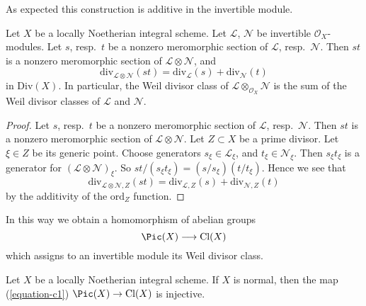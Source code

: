 \noindent
As expected this construction is additive in the invertible module.

\begin{lemma}
\label{lemma-c1-additive}
Let $X$ be a locally Noetherian integral scheme.
Let $\mathcal{L}$, $\mathcal{N}$ be invertible $\mathcal{O}_X$-modules.
Let $s$, resp.\ $t$ be a nonzero meromorphic section
of $\mathcal{L}$, resp.\ $\mathcal{N}$. Then $st$ is a nonzero
meromorphic section of $\mathcal{L} \otimes \mathcal{N}$, and
$$
\text{div}_{\mathcal{L} \otimes \mathcal{N}}(st)
=
\text{div}_\mathcal{L}(s) + \text{div}_\mathcal{N}(t)
$$
in $\text{Div}(X)$. In particular, the Weil divisor class of
$\mathcal{L} \otimes_{\mathcal{O}_X} \mathcal{N}$ is the sum
of the Weil divisor classes of $\mathcal{L}$ and $\mathcal{N}$.
\end{lemma}

\begin{proof}
Let $s$, resp.\ $t$ be a nonzero meromorphic section
of $\mathcal{L}$, resp.\ $\mathcal{N}$. Then $st$ is a nonzero
meromorphic section of $\mathcal{L} \otimes \mathcal{N}$.
Let $Z \subset X$ be a prime divisor. Let $\xi \in Z$ be its generic
point. Choose generators $s_\xi \in \mathcal{L}_\xi$, and
$t_\xi \in \mathcal{N}_\xi$. Then $s_\xi t_\xi$ is a generator
for $(\mathcal{L} \otimes \mathcal{N})_\xi$.
So $st/(s_\xi t_\xi) = (s/s_\xi)(t/t_\xi)$.
Hence we see that
$$
\text{div}_{\mathcal{L} \otimes \mathcal{N}, Z}(st)
=
\text{div}_{\mathcal{L}, Z}(s) + \text{div}_{\mathcal{N}, Z}(t)
$$
by the additivity of the $\text{ord}_Z$ function.
\end{proof}

\noindent
In this way we obtain a homomorphism of abelian groups
\begin{equation}
\label{equation-c1}
\Pic(X) \longrightarrow \text{Cl}(X)
\end{equation}
which assigns to an invertible module its Weil divisor class.

\begin{lemma}
\label{lemma-normal-c1-injective}
Let $X$ be a locally Noetherian integral scheme. If $X$ is normal,
then the map (\ref{equation-c1}) $\Pic(X) \to \text{Cl}(X)$
is injective.
\end{lemma}

